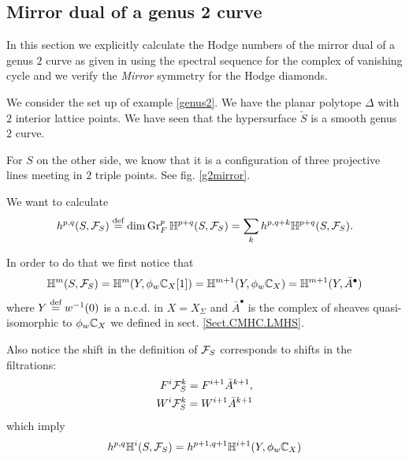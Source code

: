 \documentclass[../main.tex]{subfiles}
\begin{document}
\subsection{Mirror dual of a genus 2 curve}

In this section we explicitly calculate the Hodge numbers of the mirror dual of a genus $2$ curve as given in \cite{GKR17} using the spectral sequence for the complex of vanishing cycle and we verify the \emph{Mirror} symmetry for the Hodge diamonds.

We consider the set up of example \ref{genus2}.
We have the planar polytope $\Delta$ with $2$ interior lattice points. We have seen that the hypersurface $\check{S} $ is a smooth genus $2$ curve.

For $S$ on the other side, we know that it is a configuration of three projective lines meeting in $2$ triple points. See fig. \ref{g2mirror}.


We want to calculate
\begin{align} \label{hpqdefinition}
h^{p,q}(S, \mathcal{F}_S) \stackrel{\text{def}}{=} \dim \operatorname{Gr}^p_F \mathbb{H}^{p+q}(S, \mathcal{F}_S) = \sum_k h^{p,q+k} \mathbb{H}^{p+q}(S,\mathcal{F}_S).
\end{align}

In order to do that we first notice that 
\begin{align*}
    \mathbb{H}^{m}(S, \mathcal{F}_S) = \mathbb{H}^{m}(Y, \phi_w \mathbb{C}_X[1]) = \mathbb{H}^{m+1}(Y, \phi_w \mathbb{C}_X) = \mathbb{H}^{m+1}(Y, \bar A^\bullet)
\end{align*}
where $Y \stackrel{\text{def}}{=} w^{-1}(0)$ is a n.c.d. in $X=X_\Sigma$ and $\bar A^\bullet$ is the complex of sheaves quasi-isomorphic to $\phi_w \mathbb{C}_X$ we defined in sect. \ref{Sect.CMHC.LMHS}. 

Also notice the shift in the definition of $\mathcal{F}_S$ corresponds to shifts in the filtrations:
\begin{align*}
    F^i\mathcal{F}^k_S = F^{i+1} \bar A^{k+1}, \\
    W^i \mathcal{F}^k_S = W^{i+1} \bar A^{k+1}
\end{align*}
which imply
\begin{align} \label{shiftHdgnumbers}
    h^{p,q} \mathbb{H}^i (S, \mathcal{F}_S) = h^{p+1,q+1} \mathbb{H}^{i+1}(Y, \phi_w \mathbb{C}_X)
\end{align}
\end{document}
